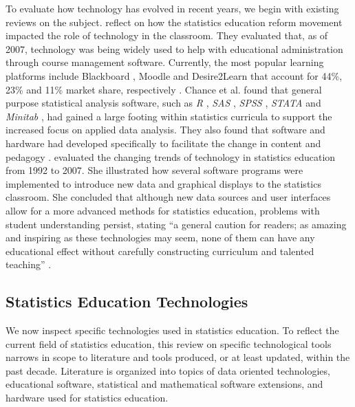 \documentclass[11pt]{isuthesis}\usepackage[]{graphicx}\usepackage[]{color}
\begin{document}
To evaluate how technology has evolved in recent years, we begin with existing reviews on the subject. \citet{chance2007} reflect on how the statistics education reform movement impacted the role of technology in the classroom. They evaluated that, as of 2007, technology was being widely used to help with educational administration through course management software. Currently, the most popular learning platforms include Blackboard \citep{Blackboard}, Moodle \citep{Moodle} and Desire2Learn \citep{Desire2Learn} that account for 44\%, 23\% and 11\% market share, respectively \citep{CampusComputing}. Chance et al. found that general purpose statistical analysis software, such as \textit{R} \citep{R}, \textit{SAS} \citep{SAS}, \textit{SPSS} \citep{SPSS}, \textit{STATA} \citep{STATA} and \textit{Minitab} \citep{Minitab}, had gained a large footing within statistics curricula to support the increased focus on applied data analysis. They also found that software and hardware had developed specifically to facilitate the change in content and pedagogy \citep{chance2007}. \citet{Rubin2007} evaluated the changing trends of technology in statistics education from 1992 to 2007. She illustrated how several software programs were implemented to introduce new data and graphical displays to the statistics classroom. She concluded that although new data sources and user interfaces allow for a more advanced methods for statistics education, problems with student understanding persist, stating ``a general caution for readers; as amazing and inspiring as these technologies may seem, none of them can have any educational effect without carefully constructing curriculum and talented teaching'' \citep[p.2]{Rubin2007}. 

\subsection{Statistics Education Technologies} 

We now inspect specific technologies used in statistics education.  To reflect the current field of statistics education, this review on specific technological tools narrows in scope to literature and tools produced, or at least updated, within the past decade. %
Literature is organized into topics of data oriented technologies, educational software, statistical and mathematical software extensions, and hardware used for statistics education.
\end{document}
